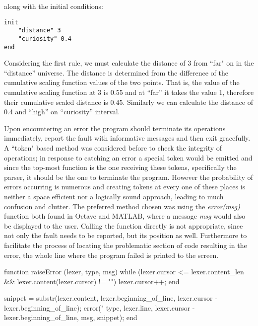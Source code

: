 along with the initial conditions:

\begin{verbatim}
init
	"distance" 3
	"curiosity" 0.4
end
\end{verbatim}

Considering the first rule, we must calculate the distance of 3 from ``far" on in the ``distance” universe. The distance is determined from the difference of the cumulative scaling function values of the two points. That is, the value of the cumulative scaling function at 3 is 0.55 and at ``far” it takes the value 1, therefore their cumulative scaled distance is 0.45. Similarly we can calculate the distance of 0.4 and “high” on “curiosity” interval.

Upon encountering an error the program should terminate its operations immediately, report the fault with informative messages and then exit gracefully. A ``token" based method was considered before to check the integrity of operations; in response to catching an error a special token would be emitted and since the top-most function is the one receiving these tokens, specifically the parser, it should be the one to terminate the program. However the probability of errors occurring is numerous and creating tokens at every one of these places is neither a space efficient nor a logically sound approach, leading to much confusion and clutter. The preferred method chosen was using the \textit{error(msg)} function both found in Octave and MATLAB, where a message \textit{msg} would also be displayed to the user. Calling the function directly is not appropriate, since not only the fault needs to be reported, but its position as well. Furthermore to facilitate the process of locating the problematic section of code resulting in the error, the whole line where the program failed is printed to the screen.

\begin{octave}
function raiseError (lexer, type, msg)
  while (lexer.cursor <= lexer.content_len &&
       lexer.content(lexer.cursor) != "\n")
    lexer.cursor++;
  end

  snippet = substr(lexer.content,
  lexer.beginning_of_line, lexer.cursor - lexer.beginning_of_line);
  error("%
    type, lexer.line, lexer.cursor - lexer.beginning_of_line,
    msg, snippet);
end
\end{octave}



